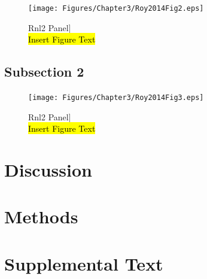 \begin{figure}[htbp]
	\centering 
	\texttt{[image: Figures/Chapter3/Roy2014Fig2.eps]}
	\caption[SeqZip Diagram]
	{
		Rnl2 Panel]\\
		\hl{Insert Figure Text}
	}
	\label{fig:Roy2014 Rnl2}
\end{figure}


\subsection{Subsection 2}

\begin{figure}[htbp]
	\centering 
	\texttt{[image: Figures/Chapter3/Roy2014Fig3.eps]}
	\caption[SeqZip Diagram]
	{
		Rnl2 Panel]\\
		\hl{Insert Figure Text}
	}
	\label{fig:Roy2014 Rnl2}
\end{figure}

\section{Discussion}\label{c3sec: Discussion}
\section{Methods}\label{c3sec: Methods}

\section{Supplemental Text}\label{c1sec: Supplemental Text}


